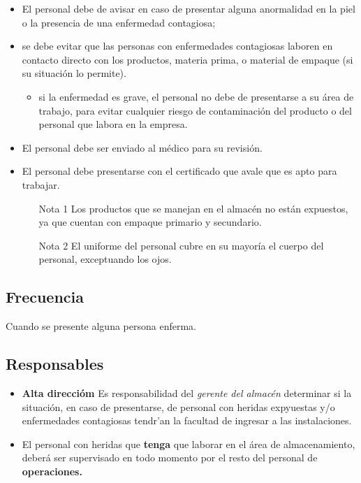 \begin{itemize}
	\item El personal debe de avisar en caso de presentar alguna anormalidad en la piel o la presencia de una enfermedad contagiosa;
	\item se debe evitar que las personas con enfermedades contagiosas laboren en contacto directo con los productos, materia prima, o material de empaque (si su situación lo permite).
	\begin{itemize}
		\item si la enfermedad es grave, el personal no debe de presentarse a su área de trabajo, para evitar cualquier riesgo de contaminación del producto o del personal que labora en la empresa.
	\end{itemize}
	\item El personal debe ser enviado al médico para su revisión.
	\item El personal debe presentarse con el certificado que avale que es apto para trabajar.
	\begin{itemize}
		\item[Nota 1] Los productos que se manejan en el almacén no están expuestos, ya que cuentan con empaque primario y secundario.
		\item[Nota 2] El uniforme del personal cubre en su mayoría el cuerpo del personal, exceptuando los ojos.
	\end{itemize}
\end{itemize}

\subsection{Frecuencia}
Cuando se presente alguna persona enferma.

\subsection{Responsables}
\begin{itemize}
	\item \textbf{Alta direccióm} Es responsabilidad del \emph{gerente del almacén} determinar si la situación, en caso de presentarse, de personal con heridas expyuestas y/o enfermedades contagiosas tendr'an la facultad de ingresar a las instalaciones. 
	\item El personal con heridas que \textbf{tenga} que laborar en el área de almacenamiento, deberá ser supervisado en todo momento por el resto del personal de \textbf{operaciones.}
\end{itemize}

